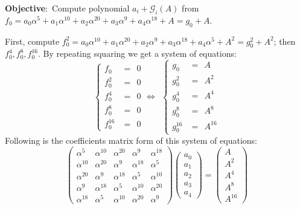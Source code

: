 \begin{Example}
\label{ex:BLVS}
{\bf Objective}:\ Compute polynomial $a_i + \mathcal{G}_i(A)$ from $f_0 = a_0\alpha^5+a_1\alpha^{10}+a_2\alpha^{20}+a_3\alpha^9+a_4\alpha^{18}+A
 = g_0 + A$.

First, compute $f_0^2= a_0\alpha^{10}+a_1\alpha^{20}+a_2\alpha^{9}+a_3\alpha^{18}+a_4\alpha^{5}+A^2 = g_0^2 + A^2$;
then $f_0^4, f_0^8, f_0^{16}$. By repeating squaring we get a system of equations:
\begin{displaymath}
  \begin{cases}
  f_0  &=\ \  0\\
  f_0^2 & =\ \  0\\
  f_0^4  &=\ \  0\\
  f_0^8  &=\ \  0\\
  f_0^{16} & =\ \ 0
  \end{cases}
\Longleftrightarrow\ \
\begin{cases}
  g_0 & =\ \  A\\
  g_0^2 & =\ \  A^2\\
  g_0^4 & =\ \  A^4\\
  g_0^8 & =\ \  A^8\\
  g_0^{16} & =\ \  A^{16}
  \end{cases}
\end{displaymath}
Following is the coefficients matrix form of this system of equations:
\begin{displaymath}
\begin{pmatrix}
\alpha^5 & \alpha^{10} & \alpha^{20} & \alpha^9 & \alpha^{18} \\
\alpha^{10} & \alpha^{20} & \alpha^9 & \alpha^{18} & \alpha^5 \\
\alpha^{20} & \alpha^9 & \alpha^{18} & \alpha^5 & \alpha^{10} \\
\alpha^9 & \alpha^{18} & \alpha^5 & \alpha^{10} & \alpha^{20} \\
\alpha^{18} & \alpha^5 & \alpha^{10} & \alpha^{20} & \alpha^9 
\end{pmatrix}
\begin{pmatrix}
a_0\\
a_1\\
a_2\\
a_3\\
a_4
\end{pmatrix}
=
\begin{pmatrix}
A\\
A^2\\
A^4\\
A^8\\
A^{16}
\end{pmatrix}
\end{displaymath}


\end{Example}
